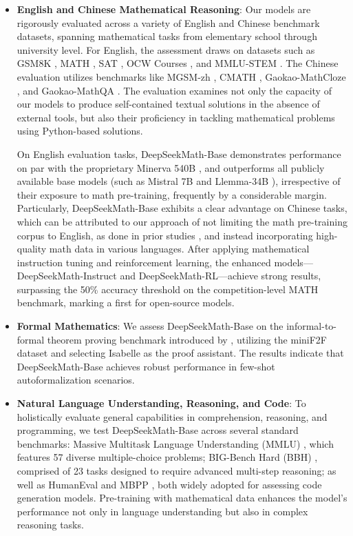 \begin{itemize}[topsep=0pt]
    \item \textbf{English and Chinese Mathematical Reasoning}: Our models are rigorously evaluated across a variety of English and Chinese benchmark datasets, spanning mathematical tasks from elementary school through university level. For English, the assessment draws on datasets such as GSM8K \citep{gsm8k}, MATH \citep{MATH}, SAT \citep{llemma}, OCW Courses \citep{minerva}, and MMLU-STEM \citep{mmlu}. The Chinese evaluation utilizes benchmarks like MGSM-zh \citep{mgsm}, CMATH \citep{wei2023cmath}, Gaokao-MathCloze \citep{agieval}, and Gaokao-MathQA \citep{agieval}. The evaluation examines not only the capacity of our models to produce self-contained textual solutions in the absence of external tools, but also their proficiency in tackling mathematical problems using Python-based solutions.

On English evaluation tasks, DeepSeekMath-Base demonstrates performance on par with the proprietary Minerva 540B \citep{minerva}, and outperforms all publicly available base models (such as Mistral 7B \citep{mistral} and Llemma-34B \citep{llemma}), irrespective of their exposure to math pre-training, frequently by a considerable margin. Particularly, DeepSeekMath-Base exhibits a clear advantage on Chinese tasks, which can be attributed to our approach of not limiting the math pre-training corpus to English, as done in prior studies \citep{minerva,llemma}, and instead incorporating high-quality math data in various languages. After applying mathematical instruction tuning and reinforcement learning, the enhanced models—DeepSeekMath-Instruct and DeepSeekMath-RL—achieve strong results, surpassing the 50\% accuracy threshold on the competition-level MATH benchmark, marking a first for open-source models.

\item \textbf{Formal Mathematics}: We assess DeepSeekMath-Base on the informal-to-formal theorem proving benchmark introduced by \citep{dsp_proof}, utilizing the miniF2F dataset \citep{minif2f} and selecting Isabelle \citep{isabelle} as the proof assistant. The results indicate that DeepSeekMath-Base achieves robust performance in few-shot autoformalization scenarios.
\item \textbf{Natural Language Understanding, Reasoning, and Code}: To holistically evaluate general capabilities in comprehension, reasoning, and programming, we test DeepSeekMath-Base across several standard benchmarks: Massive Multitask Language Understanding (MMLU) \citep{mmlu}, which features 57 diverse multiple-choice problems; BIG-Bench Hard (BBH) \citep{bbh}, comprised of 23 tasks designed to require advanced multi-step reasoning; as well as HumanEval \citep{codex} and MBPP \citep{mbpp}, both widely adopted for assessing code generation models. Pre-training with mathematical data enhances the model’s performance not only in language understanding but also in complex reasoning tasks.


\end{itemize}
